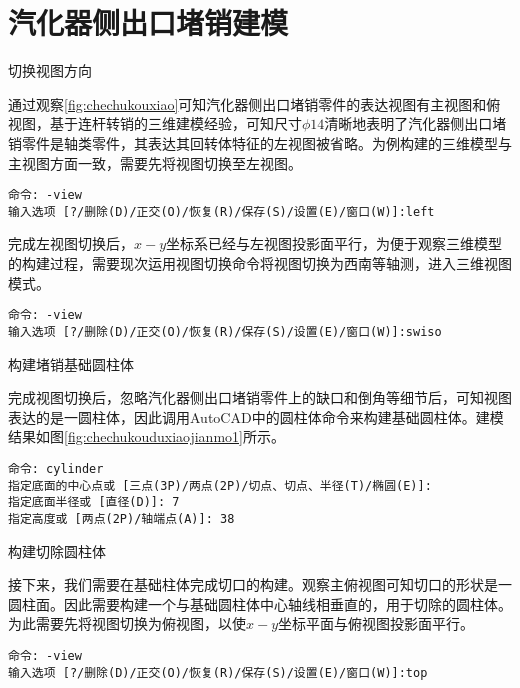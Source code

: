 \section{汽化器侧出口堵销建模}
\begin{procedure}
\item 切换视图方向

通过观察\ref{fig:chechukouxiao}可知汽化器侧出口堵销零件的表达视图有主视图和俯视图，基于连杆转销的三维建模经验，可知尺寸$\phi 14$清晰地表明了汽化器侧出口堵销零件是轴类零件，其表达其回转体特征的左视图被省略。为例构建的三维模型与主视图方面一致，需要先将视图切换至左视图。

\begin{lstlisting}
命令: -view 
输入选项 [?/删除(D)/正交(O)/恢复(R)/保存(S)/设置(E)/窗口(W)]:left
\end{lstlisting}

完成左视图切换后，$x-y$坐标系已经与左视图投影面平行，为便于观察三维模型的构建过程，需要现次运用视图切换命令将视图切换为西南等轴测，进入三维视图模式。

\begin{lstlisting}
命令: -view 
输入选项 [?/删除(D)/正交(O)/恢复(R)/保存(S)/设置(E)/窗口(W)]:swiso 
\end{lstlisting}

\item 构建堵销基础圆柱体

完成视图切换后，忽略汽化器侧出口堵销零件上的缺口和倒角等细节后，可知视图表达的是一圆柱体，因此调用AutoCAD中的圆柱体命令来构建基础圆柱体。建模结果如图\ref{fig:chechukouduxiaojianmo1}所示。

\begin{figure}[htbp]%
\centering
\begin{floatrow}[2]
\end{floatrow}
\end{figure}

\begin{lstlisting}
命令: cylinder
指定底面的中心点或 [三点(3P)/两点(2P)/切点、切点、半径(T)/椭圆(E)]:
指定底面半径或 [直径(D)]: 7
指定高度或 [两点(2P)/轴端点(A)]: 38
\end{lstlisting}

\item 构建切除圆柱体

接下来，我们需要在基础柱体完成切口的构建。观察主俯视图可知切口的形状是一圆柱面。因此需要构建一个与基础圆柱体中心轴线相垂直的，用于切除的圆柱体。为此需要先将视图切换为俯视图，以使$x-y$坐标平面与俯视图投影面平行。
\begin{lstlisting}
命令: -view 
输入选项 [?/删除(D)/正交(O)/恢复(R)/保存(S)/设置(E)/窗口(W)]:top
\end{lstlisting}


\end{procedure}
